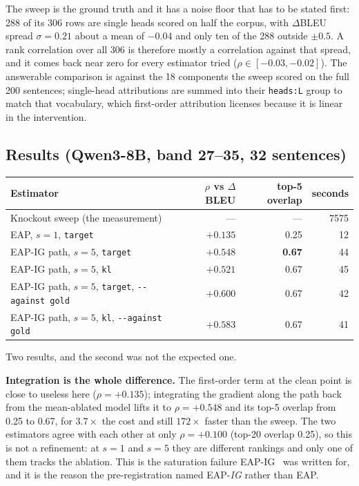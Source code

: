 \documentclass[11pt,a4paper]{article}
\begin{document}
The sweep is the ground truth and it has a noise floor that has to be stated first:
288 of its 306 rows are single heads scored on half the corpus, with $\Delta$BLEU
spread $\sigma = 0.21$ about a mean of $-0.04$ and only ten of the 288 outside
$\pm 0.5$. A rank correlation over all 306 is therefore mostly a correlation against
that spread, and it comes back near zero for every estimator tried
($\rho \in [-0.03, -0.02]$). The answerable comparison is against the 18 components
the sweep scored on the full 200 sentences; single-head attributions are summed into
their \texttt{heads:L} group to match that vocabulary, which first-order attribution
licenses because it is linear in the intervention.

\subsection{Results (Qwen3-8B, band 27--35, 32 sentences)}

\begin{center}
\begin{tabular}{lrrr}
\hline
\textbf{Estimator} & \textbf{$\rho$ vs $\Delta$BLEU} & \textbf{top-5 overlap} & \textbf{seconds} \\
\hline
Knockout sweep (the measurement) & --- & --- & 7575 \\
EAP, $s=1$, \texttt{target} & $+0.135$ & 0.25 & 12 \\
EAP-IG path, $s=5$, \texttt{target} & $\mathbf{+0.548}$ & \textbf{0.67} & 44 \\
EAP-IG path, $s=5$, \texttt{kl} & $+0.521$ & 0.67 & 45 \\
EAP-IG path, $s=5$, \texttt{target}, \texttt{-{}-against gold} & $+0.600$ & 0.67 & 42 \\
EAP-IG path, $s=5$, \texttt{kl}, \texttt{-{}-against gold} & $+0.583$ & 0.67 & 41 \\
\hline
\end{tabular}
\end{center}

Two results, and the second was not the expected one.

\textbf{Integration is the whole difference.} The first-order term at the clean point
is close to useless here ($\rho = +0.135$); integrating the gradient along the path
back from the mean-ablated model lifts it to $\rho = +0.548$ and its top-5 overlap
from 0.25 to 0.67, for $3.7\times$ the cost and still $172\times$ faster than the
sweep. The two estimators agree with each other at only $\rho = +0.100$ (top-20
overlap 0.25), so this is not a refinement: at $s=1$ and $s=5$ they are different
rankings and only one of them tracks the ablation. This is the saturation failure
EAP-IG~\cite{eapig} was written for, and it is the reason the pre-registration named
EAP-\emph{IG} rather than EAP.
\end{document}
